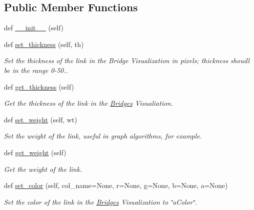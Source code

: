 \subsection*{Public Member Functions}
\begin{DoxyCompactItemize}
\item 
def \mbox{\hyperlink{class_bridges_1_1_link_visualizer_1_1_link_visualizer_a4e486ba0788bee7cf153244bd41088b0}{\+\_\+\+\_\+init\+\_\+\+\_\+}} (self)
\item 
def \mbox{\hyperlink{class_bridges_1_1_link_visualizer_1_1_link_visualizer_a8324c9809412fb0a4994ad8bae1c7166}{set\+\_\+thickness}} (self, th)
\begin{DoxyCompactList}\small\item\em Set the thickness of the link in the Bridge Visualization in pixels; thickness shoudl be in the range 0-\/50.. \end{DoxyCompactList}\item 
def \mbox{\hyperlink{class_bridges_1_1_link_visualizer_1_1_link_visualizer_a40b1bda03f571e9699ea82e3b5091df2}{get\+\_\+thickness}} (self)
\begin{DoxyCompactList}\small\item\em Get the thickness of the link in the \mbox{\hyperlink{namespace_bridges_1_1_bridges}{Bridges}} Visualiation. \end{DoxyCompactList}\item 
def \mbox{\hyperlink{class_bridges_1_1_link_visualizer_1_1_link_visualizer_a289630a8863773ef59c338befb821adf}{set\+\_\+weight}} (self, wt)
\begin{DoxyCompactList}\small\item\em Set the weight of the link, useful in graph algorithms, for example. \end{DoxyCompactList}\item 
def \mbox{\hyperlink{class_bridges_1_1_link_visualizer_1_1_link_visualizer_af99568cc9d12689dd46a90aaa633c3be}{get\+\_\+weight}} (self)
\begin{DoxyCompactList}\small\item\em Get the weight of the link. \end{DoxyCompactList}\item 
def \mbox{\hyperlink{class_bridges_1_1_link_visualizer_1_1_link_visualizer_aeafa2ddabd4c033a382317e0a01d1f85}{set\+\_\+color}} (self, col\+\_\+name=None, r=None, g=None, b=None, a=None)
\begin{DoxyCompactList}\small\item\em Set the color of the link in the \mbox{\hyperlink{namespace_bridges_1_1_bridges}{Bridges}} Visualization to \char`\"{}a\+Color\char`\"{}. \end{DoxyCompactList}\item 

\end{DoxyCompactItemize}

